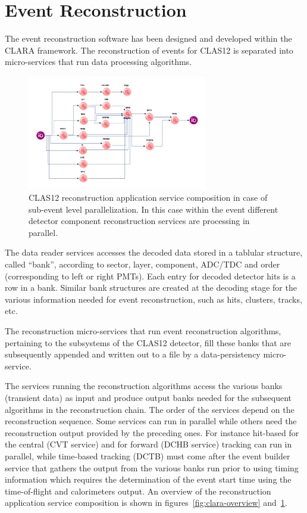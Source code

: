 \section{Event Reconstruction}
The event reconstruction software has been designed and developed within the CLARA framework.
The reconstruction of events for CLAS12 is separated into micro-services that run data processing algorithms.

\begin{figure}
\centering
\includegraphics[width=0.7\textwidth]{pics/ServiceComposition.png}
\caption{CLAS12 reconstruction application service composition in case of sub-event level parallelization.
In this case within the event different detector component reconstruction services are processing in parallel.}
\label{fig:services}
\end{figure}


The data reader services accesses the decoded data stored in a tablular structure,
called ``bank'', according to
sector, layer, component, ADC/TDC and order (corresponding to left or right PMTs). Each entry for decoded
detector hits is a row in a bank.  Similar bank structures are created at the decoding stage for the
various information needed for event reconstruction, such as hits, clusters, tracks, etc.

The reconstruction micro-services that run event reconstruction algorithms, pertaining to
the subsystems of the CLAS12 detector, fill these banks
that are subsequently appended and written out to a file by a data-persistency micro-service.

The services running the reconstruction algorithms access the various banks (transient data) as input
and produce output banks needed for the subsequent algorithms in the reconstruction chain.
The order of the services depend on the reconstruction sequence.  Some services can run in parallel while others
need the reconstruction output provided by the preceding ones.
For instance hit-based for the central (CVT service) and for forward (DCHB service) tracking
can run in parallel, while time-based tracking (DCTB) must come after the event builder service
that gathers the output from the various banks run prior to using timing information which requires
the determination of the event start time using the time-of-flight and calorimeters output.
An  overview of the reconstruction application service composition is shown in figures~\ref{fig:clara-overview} and~\ref{fig:services}.



